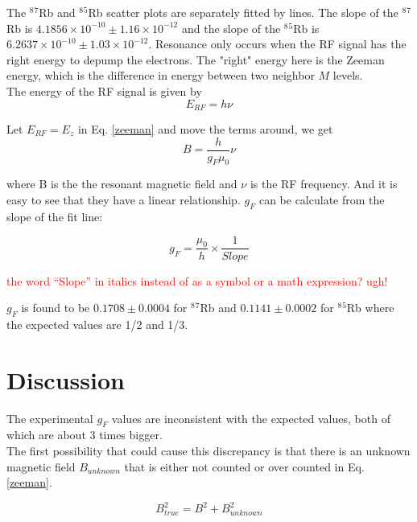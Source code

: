 \documentclass[prb,preprint]{revtex4-1}
\begin{document}
The $^8$$^7$Rb and $^8$$^5$Rb scatter plots are separately fitted by lines. The slope of the $^8$$^7$Rb is $4.1856\times 10^{-10} \pm 1.16 \times 10^{-12}$ and the slope of the $^8$$^5$Rb is $6.2637 \times 10^{-10} \pm 1.03 \times 10^{-12}$. Resonance only occurs when the RF signal has the right energy to depump the electrons. The "right" energy here is the Zeeman energy, which is the difference in energy between two neighbor $M$ levels. \\

The energy of the RF signal is given by
\begin{equation}
E_{RF}=h\nu
\label{rfenergy}
\end{equation}

Let $E_{RF}=E_{z}$ in Eq. \ref{zeeman} and move the terms around, we get
\begin{equation}
B=\frac{h}{g_{F}\mu_{0}}\nu
\label{bandf}
\end{equation}

where B is the the resonant magnetic field and $\nu$ is the RF frequency. And it is easy to see that they have a linear relationship. $g_{F}$ can be calculate from the slope of the fit line:

\begin{equation}
g_{F}=\frac{\mu_{0}}{h} \times \frac{1}{Slope}
\label{gf}
\end{equation}

\textcolor{red}{the word ``Slope'' in italics instead of as a symbol or a math expression? ugh!} 

$g_{F}$ is found to be $0.1708\pm0.0004$ for $^8$$^7$Rb and $0.1141\pm0.0002$ for $^8$$^5$Rb where the expected values are 1/2 and 1/3.



\section{Discussion}
The experimental $g_{F}$ values are inconsistent with the expected values, both of which are about 3 times bigger.\\
The first possibility that could cause this discrepancy is that there is an unknown magnetic field $B_{unknown}$ that is either not counted or over counted in Eq. \ref{zeeman}. 

\begin{equation}
B_{true}^{2}=B^{2}+B_{unknown}^{2}
\label{bnew}
\end{equation}
\end{document}
